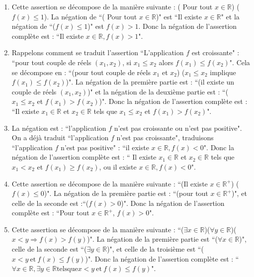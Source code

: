 \documentclass[11pt,a4paper]{article}
\newcommand{\Rr}{\mathbb{R}} \newcommand{\R}{\mathbb{R}}
\begin{document}
\begin{enumerate}
\item Cette assertion se d\'ecompose de la mani\`ere suivante : ( Pour tout $x\in
  {\Rr}$) ($f(x)\leq 1$). La n\'egation de ``( Pour tout $x\in
  {\Rr}$)" est ``Il existe $x\in {\Rr}$" et la n\'egation de ``($f(x)\leq 1$)" est
$ f(x)>1$. Donc la n\'egation de l'assertion compl\`ete est : ``Il
existe $x\in {\Rr},  f(x)>1$".

\item Rappelons comment se traduit l'assertion ``L'application $f$ est
  croissante" : ``pour tout couple de r\'eels $(x_1,x_2)$, si $x_1\leq x_2$
  alors $f(x_1) \leq f(x_2)$". Cela se d\'ecompose en : ``(pour tout couple de
  r\'eels $x_1$ et $x_2$) ($x_1\leq x_2$ implique $f(x_1) \leq f(x_2)$)".
La n\'egation de la premi\`ere partie est : ``(il existe un couple de
r\'eels $(x_1,x_2)$)" et la n\'egation de la deuxi\`eme partie est :
``($x_1\leq x_2$ et $f(x_1) > f(x_2)$)". Donc la n\'egation de
l'assertion compl\`ete est : ``Il existe $x_1\in \Rr$ et $x_2\in
\Rr$ tels que $x_1 \leq x_2$ et $f(x_1) > f(x_2)$".

\item La n\'egation est : ``l'application $f$ n'est pas croissante ou n'est pas
  positive". On a d\'ej\`a traduit ``l'application $f$ n'est pas croissante",
  traduisons ``l'application $f$ n'est pas positive" : ``il existe $x \in \Rr,
  f(x)<0$". Donc la n\'egation de l'assertion compl\`ete est : ``
Il existe $x_1\in \Rr$ et $x_2\in \Rr$ tels que $x_1<x_2$ et
$f(x_1) \geq f(x_2)$, ou il existe $x \in \Rr,
  f(x)<0$".

\item Cette assertion se d\'ecompose de la mani\`ere suivante : ``(Il existe $x\in
  {\Rr}^+$) ($f(x)\leq 0$)". La n\'egation de la premi\`ere partie est : ``(pour
  tout $x\in  {\Rr}^+$)", et celle de la seconde est :``($f(x)> 0$)".
  Donc la n\'egation de l'assertion compl\`ete est : ``Pour tout $x\in {\Rr}^+$,  $f(x)> 0$".

\item Cette assertion se d\'ecompose de la mani\`ere suivante : 
``($\exists x \in {\Rr}$)($\forall y \in {\Rr}$)($ x<y \Rightarrow f(x)>f(y)$)".  
La n\'egation de la premi\`ere partie est ``($\forall x \in  {\Rr}$)", celle de la
seconde est ``($\exists y \in {\Rr}$)", et celle de la troisi\`eme est
``($ x<y \mathrm{\ et\ } f(x)\leq f(y)$)". Donc la n\'egation de
l'assertion compl\`ete est : `` $\forall x \in {\Rr}, \exists y \in
{\Rr} \mathrm{ tels que } x<y \mathrm{\ et\ } f(x)\leq f(y)$".
\end{enumerate}
\end{document}
